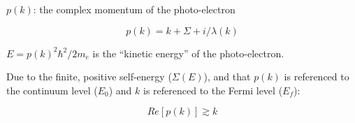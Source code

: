\begin{slide}{${p(k)}$: the complex momentum of the photo-electron }

    \[{p(k) = k + \Sigma + i / \lambda(k) } \]

    ${E = p(k)^2 \hbar^2 / 2m_e }$ is the ``kinetic energy'' of the
    photo-electron.

    \vmm 

    \begin{center} 
    \end{center}
      
    \vmm \vmm 
    
    Due to the finite, positive self-energy (${\Sigma(E)}$), and
    that ${p(k)}$ is referenced to the continuum level
    (${E_0}$) and ${k}$ is referenced to the Fermi level
    (${E_f}$):

    \[{Re[p(k)] \gtrsim k}\]

      
    \vmm \vmm
    

  \vfill
\end{slide} 


%     
%       
% 
%         
%         
% 
%         
%         

